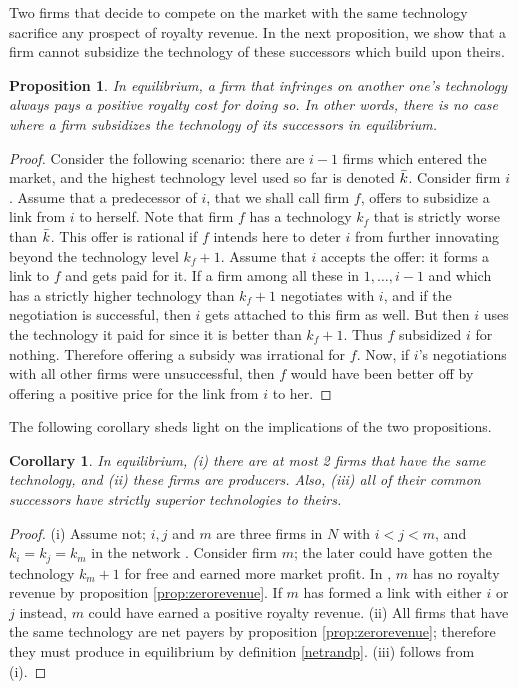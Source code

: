 \documentclass{article}
\newtheorem{corollary}{Corollary}
\newtheorem{proposition}{Proposition}
\begin{document}
Two firms that decide to compete on the market with the same technology sacrifice any prospect of royalty revenue. In the next proposition, we show that a firm cannot subsidize the technology of these successors which build upon theirs. \\

\begin{proposition}\label{prop:positiveroyality}
In equilibrium, a firm that infringes on another one's technology always pays a positive royalty cost for doing so. In other words, there is no case where a firm subsidizes the technology of its successors in equilibrium.
\end{proposition}
\begin{proof}
Consider the following scenario: there are $i-1$ firms which entered the market, and the highest technology level used so far is denoted $\Bar{k}$. Consider firm $i$. Assume that a predecessor of $i$, that we shall call firm $f$, offers to subsidize a link from $i$ to herself. Note that firm $f$ has a technology $k_f$ that is strictly worse than $\Bar{k}$. This offer is rational if $f$ intends here to deter $i$ from further innovating beyond the technology level $k_f+1$. Assume that $i$ accepts the offer: it forms a link to $f$ and gets paid for it. If a firm among all these in $1,\ldots, i-1$ and which has a strictly higher technology than $k_f+1$ negotiates with $i$, and if the negotiation is successful, then $i$ gets attached to this firm as well. But then $i$ uses the technology it paid for since it is better than $k_f+1$. Thus $f$ subsidized $i$ for nothing. Therefore offering a subsidy was irrational for $f$. Now, if $i$'s negotiations with all other firms were unsuccessful, then $f$ would have been better off by offering a positive price for the link from $i$ to her. 
\end{proof}

The following corollary sheds light on the implications of the two propositions. \\

\begin{corollary}\label{firmswithsametech}
In equilibrium, (i) there are at most 2 firms that have the same technology, and (ii) these firms are producers. Also, (iii) all of their common successors have strictly superior technologies to theirs. 
\end{corollary}
\begin{proof}
(i) Assume not; $i,j$ and $m$ are three firms in $N$ with $i<j<m$, and $k_i=k_j=k_m$ in the network . Consider firm $m$; the later could have gotten the technology $k_m+1$ for free and earned more market profit. In , $m$ has no royalty revenue by proposition \ref{prop:zerorevenue}. If $m$ has formed a link with either $i$ or $j$ instead, $m$ could have earned a positive royalty revenue. (ii) All firms that have the same technology are net payers by proposition \ref{prop:zerorevenue}; therefore they must produce in equilibrium by definition \ref{netrandp}. (iii) follows from (i). 
\end{proof}
\end{document}
